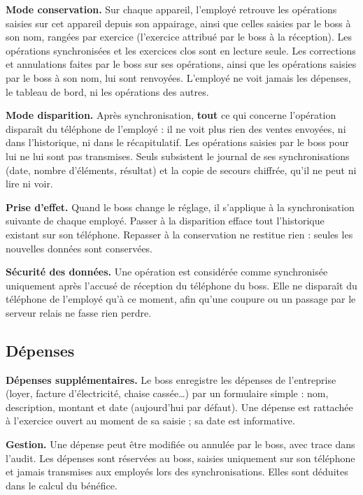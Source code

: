 \documentclass[11pt,a4paper]{article}
\newcommand{\fonc}[2]{\textbf{#1.} #2\par\vspace{0.2em}}
\begin{document}
	\fonc{Mode conservation}{Sur chaque appareil, l'employé retrouve les opérations saisies sur cet appareil depuis son appairage, ainsi que celles saisies par le boss à son nom, rangées par exercice (l'exercice attribué par le boss à la réception). Les opérations synchronisées et les exercices clos sont en lecture seule. Les corrections et annulations faites par le boss sur ses opérations, ainsi que les opérations saisies par le boss à son nom, lui sont renvoyées. L'employé ne voit jamais les dépenses, le tableau de bord, ni les opérations des autres.}

	\fonc{Mode disparition}{Après synchronisation, \textbf{tout} ce qui concerne l'opération disparaît du téléphone de l'employé : il ne voit plus rien des ventes envoyées, ni dans l'historique, ni dans le récapitulatif. Les opérations saisies par le boss pour lui ne lui sont pas transmises. Seuls subsistent le journal de ses synchronisations (date, nombre d'éléments, résultat) et la copie de secours chiffrée, qu'il ne peut ni lire ni voir.}

	\fonc{Prise d'effet}{Quand le boss change le réglage, il s'applique à la synchronisation suivante de chaque employé. Passer à la disparition efface tout l'historique existant sur son téléphone. Repasser à la conservation ne restitue rien : seules les nouvelles données sont conservées.}

	\fonc{Sécurité des données}{Une opération est considérée comme synchronisée uniquement après l'accusé de réception du téléphone du boss. Elle ne disparaît du téléphone de l'employé qu'à ce moment, afin qu'une coupure ou un passage par le serveur relais ne fasse rien perdre.}

	\subsection{Dépenses}

	\fonc{Dépenses supplémentaires}{Le boss enregistre les dépenses de l'entreprise (loyer, facture d'électricité, chaise cassée\dots) par un formulaire simple : nom, description, montant et date (aujourd'hui par défaut). Une dépense est rattachée à l'exercice ouvert au moment de sa saisie ; sa date est informative.}

	\fonc{Gestion}{Une dépense peut être modifiée ou annulée par le boss, avec trace dans l'audit. Les dépenses sont réservées au boss, saisies uniquement sur son téléphone et jamais transmises aux employés lors des synchronisations. Elles sont déduites dans le calcul du bénéfice.}
\end{document}
